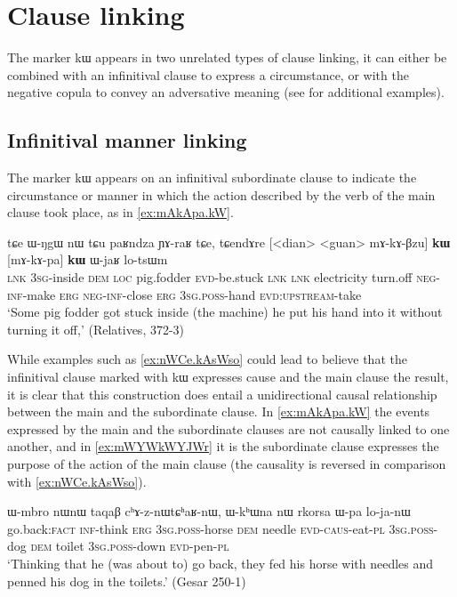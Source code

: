 \documentclass[oldfontcommands,oneside,a4paper,11pt]{article}
\newcommand{\ipa}[1]{{\phon #1}} %
\begin{document}
  
 \section{Clause linking} \label{sec:linking}
 The marker \ipa{kɯ} appears in two unrelated types of clause linking, it can either be combined with an infinitival clause to express a circumstance, or with the negative copula to convey an adversative meaning (see \citealt{jacques14linking} for additional examples).
 
 \subsection{Infinitival manner linking} \label{sec:manner}
The marker \ipa{kɯ}  appears on an infinitival subordinate clause  to indicate the circumstance or manner in which the action described by the verb of the main clause took place, as in \ref{ex:mAkApa.kW}. 

\begin{exe}
\ex \label{ex:mAkApa.kW}
\gll
\ipa{tɕe}   	\ipa{ɯ-ŋgɯ}   	\ipa{nɯ} \ipa{tɕu}   	\ipa{paʁndza}   	\ipa{ɲɤ-raʁ}   	\ipa{tɕe,}   	\ipa{tɕendɤre}   	[<dian>   	<guan>   	\ipa{mɤ-kɤ-βzu}] 	\ipa{\textbf{kɯ}}   	[\ipa{mɤ-kɤ-pa}]   	\ipa{\textbf{kɯ}}   	\ipa{ɯ-jaʁ}   	\ipa{lo-tsɯm}   \\
\textsc{lnk} \textsc{3sg}-inside \textsc{dem} \textsc{loc} pig.fodder \textsc{evd}-be.stuck \textsc{lnk}
\textsc{lnk} electricity turn.off \textsc{neg-inf}-make \textsc{erg}  \textsc{neg-inf}-close \textsc{erg}  \textsc{3sg.poss}-hand \textsc{evd:upstream}-take \\
\glt `Some pig fodder got stuck inside (the machine) he put his hand into it without turning it off,' (Relatives, 372-3)
\end{exe} 

 While  examples such as \ref{ex:nWCe.kAsWso} could lead to believe that the infinitival clause marked with \ipa{kɯ}  expresses  cause and the main clause the result, it is clear that this construction does entail a unidirectional causal relationship between the main and the subordinate clause. In \ref{ex:mAkApa.kW} the events expressed by the main and the subordinate clauses are not causally linked to one another, and in  \ref{ex:mWYWkWYJWr} it is the subordinate clause expresses the purpose of the action of the main clause (the causality is reversed in comparison with \ref{ex:nWCe.kAsWso}).

  \begin{exe}
\ex \label{ex:nWCe.kAsWso}
\gll 
[\ipa{nɯɕe}  	\ipa{kɤ-sɯso}]  	\ipa{kɯ,}  	\ipa{ɯ-mbro}  	\ipa{nɯnɯ}  	\ipa{taqaβ}  	\ipa{cʰɤ-z-nɯtɕʰaʁ-nɯ,}  	\ipa{ɯ-kʰɯna}  	\ipa{nɯ}  	\ipa{rkorsa}  	\ipa{ɯ-pa}  	\ipa{lo-ja-nɯ}  \\
go.back:\textsc{fact} \textsc{inf}-think \textsc{erg} \textsc{3sg.poss}-horse \textsc{dem} needle \textsc{evd-caus}-eat-\textsc{pl}   \textsc{3sg.poss}-dog \textsc{dem} toilet \textsc{3sg.poss}-down \textsc{evd}-pen-\textsc{pl} \\
\glt `Thinking that he (was about to) go back, they fed his horse with needles and penned his dog in the toilets.' (Gesar 250-1)
 \end{exe} 
 
\end{document}
